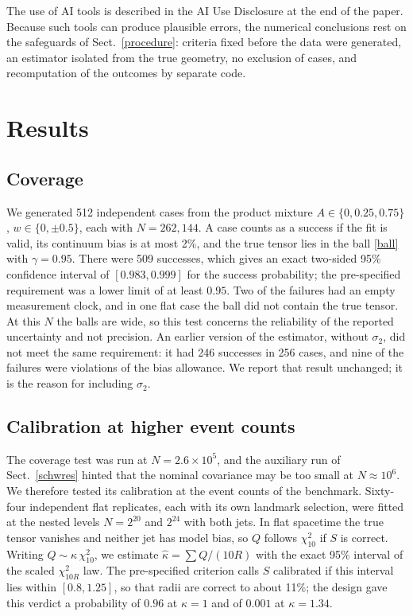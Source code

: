\documentclass[11pt,a4paper]{article}
\begin{document}
The use of AI tools is described in the AI Use Disclosure at the end of the
paper. Because such tools can produce plausible errors, the numerical
conclusions rest on the safeguards of Sect.~\ref{procedure}: criteria fixed
before the data were generated, an estimator isolated from the true
geometry, no exclusion of cases, and recomputation of the outcomes by
separate code.

\section{Results}\label{results}
\subsection{Coverage}
We generated 512 independent cases from the product mixture
$A\in\{0,0.25,0.75\}$, $w\in\{0,\pm0.5\}$, each with $N=262{,}144$. A case
counts as a success if the fit is valid, its continuum bias is at most 2\%,
and the true tensor lies in the ball \eqref{ball} with $\gamma=0.95$. There
were 509 successes, which gives an exact two-sided 95\% confidence interval
\cite{clopper} of $[0.983,0.999]$ for the success probability; the
pre-specified requirement was a lower limit of at least $0.95$. Two of the
failures had an empty measurement clock, and in one flat case the ball did
not contain the true tensor. At this $N$ the balls are wide, so this test
concerns the reliability of the reported uncertainty and not precision. An
earlier version of the estimator, without $\sigma_2$, did not meet the same
requirement: it had 246 successes in 256 cases, and nine of the failures
were violations of the bias allowance. We report that result unchanged; it
is the reason for including $\sigma_2$.

\subsection{Calibration at higher event counts}\label{calibration}
The coverage test was run at $N=2.6\times10^5$, and the auxiliary run of
Sect.~\ref{schwres} hinted that the nominal covariance may be too small at
$N\approx10^6$. We therefore tested its calibration at the event counts of
the benchmark. Sixty-four independent flat replicates, each with its own
landmark selection, were fitted at the nested levels $N=2^{20}$ and
$2^{24}$ with both jets.
In flat spacetime the true tensor vanishes and neither jet has model bias,
so $Q$ follows $\chi^2_{10}$ if $S$ is correct. Writing $Q\sim\kappa\,
\chi^2_{10}$, we estimate $\hat\kappa=\sum Q/(10R)$ with the exact 95\%
interval of the scaled $\chi^2_{10R}$ law. The pre-specified criterion calls
$S$ calibrated if this interval lies within $[0.8,1.25]$, so that radii are
correct to about 11\%; the design gave this verdict a probability of $0.96$
at $\kappa=1$ and of $0.001$ at $\kappa=1.34$.
\end{document}
